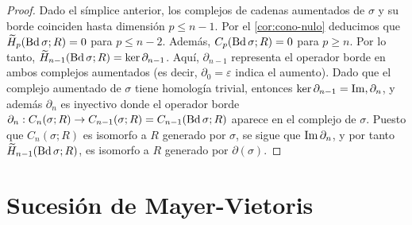 \begin{proof}
	Dado el símplice anterior, los complejos de cadenas aumentados de $\sigma$ y su borde coinciden hasta dimensión $p \leq n-1$. Por el \autoref{cor:cono-nulo} deducimos que $\widetilde{H}_p(\operatorname{Bd} \sigma; R) = 0$ para $p \leq n-2$. Además, $C_p(\operatorname{Bd} \sigma; R) = 0$ para $p \geq n$. Por lo tanto, $\widetilde{H}_{n-1}(\operatorname{Bd}\sigma;R)=\ker \partial_{n-1}$. Aquí, $\partial_{n-1}$ representa el operador borde en ambos complejos aumentados (es decir, $\partial_{0}=\varepsilon$ indica el aumento). Dado que el complejo aumentado de $\sigma$ tiene homología trivial, entonces $\ker \partial_{n-1}=\operatorname{Im}, \partial_{n}$, y además $\partial_{n}$ es inyectivo donde el operador borde $\partial_n: C_n(\sigma; R) \rightarrow C_{n-1}(\sigma; R) = C_{n-1}(\operatorname{Bd} \sigma; R)$ aparece en el complejo de $\sigma$. Puesto que $C_n(\sigma;R)$ es isomorfo a $R$ generado por $\sigma$, se sigue que $\operatorname{Im} \partial_n$, y por tanto $\widetilde{H}_{n-1}(\operatorname{Bd}\sigma;R)$, es isomorfo a $R$ generado por $\partial(\sigma)$.
\end{proof}

\section{Sucesión de Mayer-Vietoris}

